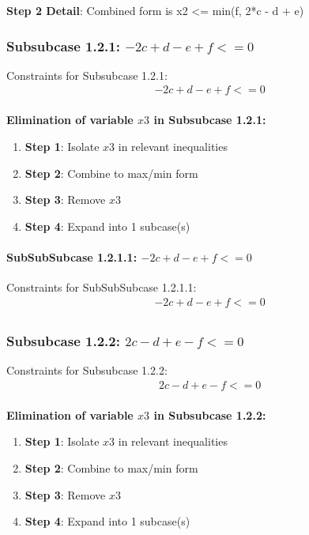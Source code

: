 \documentclass{article}
\begin{document}
\textbf{Step 2 Detail}: Combined form is x2 <= min(f, 2*c - d + e)

\subsubsection{Subsubcase 1.2.1: $-2 c + d - e + f <= 0$}

Constraints for Subsubcase 1.2.1:
\begin{align}
& - 2 c + d - e + f <= 0 \\
\end{align}

\textbf{Elimination of variable $x3$ in Subsubcase 1.2.1:}

\begin{enumerate}
\item \textbf{Step 1}: Isolate $x3$ in relevant inequalities
\item \textbf{Step 2}: Combine to max/min form
\item \textbf{Step 3}: Remove $x3$
\item \textbf{Step 4}: Expand into 1 subcase(s)
\end{enumerate}

\paragraph{SubSubSubcase 1.2.1.1: $-2 c + d - e + f <= 0$}

Constraints for SubSubSubcase 1.2.1.1:
\begin{align}
& - 2 c + d - e + f <= 0 \\
\end{align}

\subsubsection{Subsubcase 1.2.2: $2 c - d + e - f <= 0$}

Constraints for Subsubcase 1.2.2:
\begin{align}
& 2 c - d + e - f <= 0 \\
\end{align}

\textbf{Elimination of variable $x3$ in Subsubcase 1.2.2:}

\begin{enumerate}
\item \textbf{Step 1}: Isolate $x3$ in relevant inequalities
\item \textbf{Step 2}: Combine to max/min form
\item \textbf{Step 3}: Remove $x3$
\item \textbf{Step 4}: Expand into 1 subcase(s)
\end{enumerate}
\end{document}
